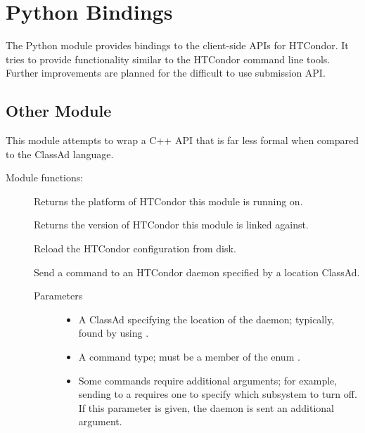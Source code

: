 \section{\label{API-Python} Python Bindings}

The Python module provides bindings to the client-side APIs for HTCondor.  
It tries to provide functionality similar to the HTCondor command line tools.
Further improvements are planned for the difficult to use submission API.

\subsection{\label{Python-OtherModule} Other Module}
This module attempts to wrap a C++ API that is
far less formal when compared to the ClassAd language.

Module functions:
%
%
\begin{description}
\item []
  Returns the platform of HTCondor this module is running on.
  
\item []
  Returns the version of HTCondor this module is linked against.

\item []
  Reload the HTCondor configuration from disk.

\item []
  Send a command to an HTCondor daemon specified by a location ClassAd.

  \begin{description}
    \item[ Parameters]
    \begin{itemize}
      \item {} A ClassAd specifying the location of the daemon; 
      typically, found by using .
      \item {} A command type; 
      must be a member of the enum .
      \item {} Some commands require additional arguments; 
      for example, sending  to a  requires 
      one to specify which subsystem to turn off.  
      If this parameter is given, the daemon is sent an additional argument.
    \end{itemize}
  \end{description}  

\end{description}

